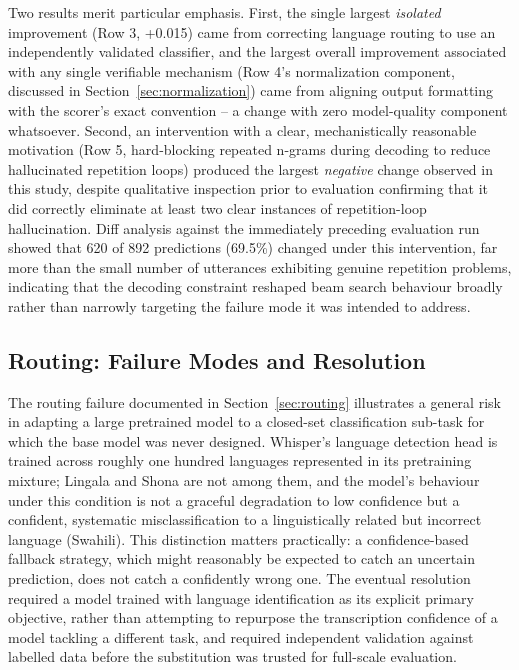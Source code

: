 \documentclass[11pt]{article}
\begin{document}
Two results merit particular emphasis. First, the single largest \emph{isolated} improvement (Row 3, +0.015) came from correcting language routing to use an independently validated classifier, and the largest overall improvement associated with any single verifiable mechanism (Row 4's normalization component, discussed in Section~\ref{sec:normalization}) came from aligning output formatting with the scorer's exact convention -- a change with zero model-quality component whatsoever. Second, an intervention with a clear, mechanistically reasonable motivation (Row 5, hard-blocking repeated n-grams during decoding to reduce hallucinated repetition loops) produced the largest \emph{negative} change observed in this study, despite qualitative inspection prior to evaluation confirming that it did correctly eliminate at least two clear instances of repetition-loop hallucination. Diff analysis against the immediately preceding evaluation run showed that 620 of 892 predictions (69.5\%) changed under this intervention, far more than the small number of utterances exhibiting genuine repetition problems, indicating that the decoding constraint reshaped beam search behaviour broadly rather than narrowly targeting the failure mode it was intended to address.

\subsection{Routing: Failure Modes and Resolution}
\label{sec:routing-failure}

The routing failure documented in Section~\ref{sec:routing} illustrates a general risk in adapting a large pretrained model to a closed-set classification sub-task for which the base model was never designed. Whisper's language detection head is trained across roughly one hundred languages represented in its pretraining mixture; Lingala and Shona are not among them, and the model's behaviour under this condition is not a graceful degradation to low confidence but a confident, systematic misclassification to a linguistically related but incorrect language (Swahili). This distinction matters practically: a confidence-based fallback strategy, which might reasonably be expected to catch an uncertain prediction, does not catch a confidently wrong one. The eventual resolution required a model trained with language identification as its explicit primary objective, rather than attempting to repurpose the transcription confidence of a model tackling a different task, and required independent validation against labelled data before the substitution was trusted for full-scale evaluation.
\end{document}
